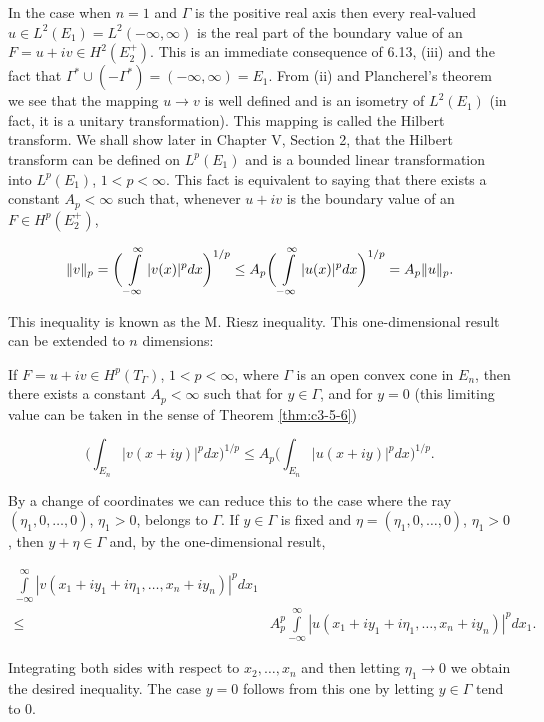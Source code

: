  In the case when $n=1$ and $\Gamma$ is the positive real axis then every real-valued $u\in L^{2}(E_{1})=L^{2}(-\infty,\infty)$ is the real part of the boundary value of an $F=u+iv\in H^{2}(E_{2}^{+})$. This is an immediate consequence of 6.13, (iii) and the fact that $\Gamma^{*}\cup(-\Gamma^{*})=(-\infty,\infty)=E_{1}$. From (ii) and Plancherel's theorem we see that the mapping $u\to v$ is well defined and is an isometry of $L^{2}(E_{1})$ (in fact, it is a unitary transformation). This mapping is called the Hilbert transform. We shall show later in Chapter V, Section 2, that the Hilbert transform can be defined on $L^{p}(E_{1})$ and is a bounded linear transformation into $L^{p}(E_{1})$, $1<p<\infty$. This fact is equivalent to saying that there exists a constant $A_{p}<\infty$ such that, whenever $u+iv$ is the boundary value of an $F\in H^{p}(E_{2}^{+})$,

\[
\|v\|_{p}=\bigg(\intop_{-\infty}^{\infty}|v(x)|^{p}d x\bigg)^{1/p}\leq A_{p}\bigg(\intop_{-\infty}^{\infty}|u(x)|^{p}d x\bigg)^{1/p}=A_{p}\|u\|_{p}.
\]

This inequality is known as the M. Riesz inequality. This one-dimensional result can be extended to $n$ dimensions:

If $F = u + iv \in H^p(T_\Gamma)$, $1 < p < \infty$, where $\Gamma$ is an open convex cone in $E_n$, then there exists a constant $A_p < \infty$ such that for $y \in \Gamma$, and for $y = 0$ (this limiting value can be taken in the sense of Theorem \ref{thm:c3-5-6})

\[
\biggl(\int_{E_{n}}|v(x+i y)|^{p}d x\biggr)^{1/p}\leq A_{p}\biggl(\int_{E_{n}}|u(x+i y)|^{p}d x\biggr)^{1/p}.
\]

By a change of coordinates we can reduce this to the case where the ray $(\eta_1, 0, \ldots, 0)$, $\eta_1 > 0$, belongs to $\Gamma$. If $y \in \Gamma$ is fixed and $\eta = (\eta_1, 0, \ldots, 0)$, $\eta_1 > 0$, then $y + \eta \in \Gamma$ and, by the one-dimensional result,

\[
\begin{aligned}\int\limits_{-\infty}^{\infty}|v(x_{1}+iy_{1}+i\eta_{1},\ldots,x_{n}+iy_{n})|^{p} dx_{1}\\\leq& A_{p}^{p}\int\limits_{-\infty}^{\infty}|u(x_{1}+iy_{1}+i\eta_{1},\ldots,x_{n}+iy_{n})|^{p} dx_{1}.\end{aligned}
\]

Integrating both sides with respect to $x_2, \ldots, x_n$ and then letting $\eta_1 \to 0$ we obtain the desired inequality. The case $y = 0$ follows from this one by letting $y \in \Gamma$ tend to 0.

